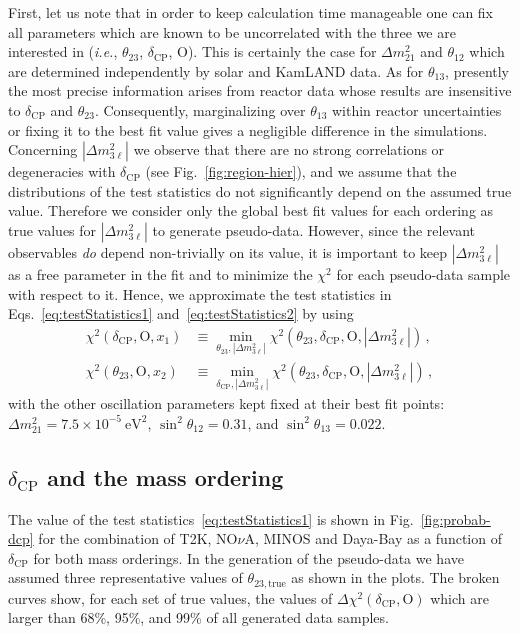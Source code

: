 \documentclass[a4paper, 11pt]{article}
\newcommand{\Dmq}{\Delta m^2}
\begin{document}
First, let us note that in order to keep calculation time manageable
one can fix all parameters which are known to be uncorrelated with the
three we are interested in (\textit{i.e.}, $\theta_{23}$,
$\delta_\text{CP}$, O).  This is certainly the case for $\Dmq_{21}$
and $\theta_{12}$ which are determined independently by solar and
KamLAND data. As for $\theta_{13}$, presently the most precise
information arises from reactor data whose results are insensitive to
$\delta_\text{CP}$ and $\theta_{23}$.  Consequently, marginalizing over
$\theta_{13}$ within reactor uncertainties or fixing it to the best
fit value gives a negligible difference in the simulations. Concerning
$|\Dmq_{3\ell}|$ we observe that there are no strong correlations or
degeneracies with $\delta_\text{CP}$ (see Fig.~\ref{fig:region-hier}),
and we assume that the distributions of the test statistics do not
significantly depend on the assumed true value. Therefore we consider
only the global best fit values for each ordering as true values for
$|\Dmq_{3\ell}|$ to generate pseudo-data. However, since the relevant
observables \emph{do} depend non-trivially on its value, it is
important to keep $|\Dmq_{3\ell}|$ as a free parameter in the fit and
to minimize the $\chi^2$ for each pseudo-data sample with respect to
it.  Hence, we approximate the test statistics in
Eqs.~\eqref{eq:testStatistics1} and~\eqref{eq:testStatistics2} by
using
%
\begin{align}
  \chi^2 \left(\delta_\text{CP}, \text{O}, x_1\right)
  &\equiv
  \min_{\theta_{23}, |\Dmq_{3\ell}|}
  \chi^2 \left(\theta_{23}, \delta_\text{CP}, \text{O}, |\Dmq_{3\ell}|\right)  \,,
  \\
  \chi^2 \left(\theta_{23}, \text{O}, x_2 \right)
  &\equiv
  \min_{\delta_\text{CP}, |\Dmq_{3\ell}|}
  \chi^2 \left(\theta_{23}, \delta_\text{CP}, \text{O}, |\Dmq_{3\ell}| \right) \,,
\end{align}
%
with the other oscillation parameters kept fixed at their best fit
points: $\Dmq_{21} = 7.5 \times 10^{-5}~\text{eV}^2$,
$\sin^2\theta_{12} = 0.31$, and $\sin^2\theta_{13} = 0.022$.

\subsection{$\delta_\text{CP}$ and the mass ordering}

The value of the test statistics~\eqref{eq:testStatistics1} is shown
in Fig.~\ref{fig:probab-dcp} for the combination of T2K, NO$\nu$A,
MINOS and Daya-Bay as a function of $\delta_\text{CP}$ for both mass
orderings. In the generation of the pseudo-data we have assumed three
representative values of $\theta_{23,\text{true}}$ as shown in the
plots.  The broken curves show, for each set of true values, the values
of $\Delta\chi^2(\delta_\text{CP}, \text{O})$ which are larger than
68\%, 95\%, and 99\% of all generated data samples.
\end{document}
